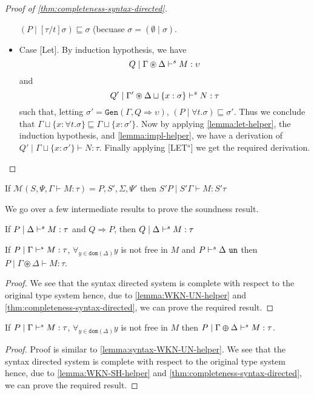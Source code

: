 \begin{proof}[Proof of \cref{thm:completeness-syntax-directed}]
\begin{itemize}
    $(P \mid [\tau / t]\sigma) \sqsubseteq \sigma$ (becuase $\sigma = (\emptyset \mid \sigma)$.
  \item{Case [Let].}
    By induction hypothesis, we have $$Q \mid \Gamma \circledast \Delta \vdash^s M: \upsilon$$ and
    $$Q' \mid \Gamma' \circledast \Delta \sqcup \{x:\sigma\} \vdash^s N:\tau$$
    such that, letting $\sigma' = \texttt{Gen}(\Gamma, Q \Rightarrow \upsilon)$, $(P \mid \forall t. \sigma) \sqsubseteq \sigma'$. Thus we conclude that
    $\Gamma \sqcup \{ x:\forall t. \sigma \} \sqsubseteq   \Gamma \sqcup \{ x:\sigma'\}$. Now by applying \cref{lemma:let-helper}, the induction hypothesis, and \cref{lemma:impl-helper},
    we have a derivation of $Q' \mid \Gamma \sqcup \{ x:\sigma'\} \vdash N:\tau$. Finally applying [LET$^s$] we get the required derivation.
      \qedhere
  \end{itemize}
\end{proof}


\begin{theorem}\label{thm:soundness-m}
   If $\mathcal{M}(S, \Psi, \Gamma \vdash M : \tau) = P, S', \Sigma, \Psi'$ then $S' P \mid S' \Gamma \vdash M : S' \tau$
 \end{theorem}

We go over a few intermediate results to prove the soundness result.

\begin{lemma}\label{lemma:strengthen}
  If $P \mid \Delta \vdash^s M:\tau$ and $Q \Rightarrow P$, then $Q \mid \Delta \vdash^s M: \tau$
\end{lemma}

\begin{lemma}\label{lemma:syntax-WKN-UN-helper}
  If $P \mid \Gamma \vdash^s M:\tau$, $\forall_{y \in \texttt{dom}(\Delta)} y$ is not free in $M$ and $P \vdash^s \Delta\ \texttt{un}$
  then $P \mid \Gamma \circledast \Delta \vdash M:\tau$.
\end{lemma}
\begin{proof}
  We see that the syntax directed system is complete with respect to the original type system hence, due to \cref{lemma:WKN-UN-helper} and \cref{thm:completeness-syntax-directed}, we can prove the required result.
\end{proof}

\begin{lemma}\label{lemma:syntax-WKN-SH-helper}
  If $P \mid \Gamma \vdash^s M:\tau$, $\forall_{y \in \texttt{dom}(\Delta)} y$ is not free in $M$ then $P \mid \Gamma \varoplus \Delta \vdash^s M:\tau$.
\end{lemma}
\begin{proof}
  Proof is similar to \cref{lemma:syntax-WKN-UN-helper}. We see that the syntax directed system is complete with respect to the original type system hence,
  due to \cref{lemma:WKN-SH-helper} and \cref{thm:completeness-syntax-directed}, we can prove the required result.
\end{proof}


